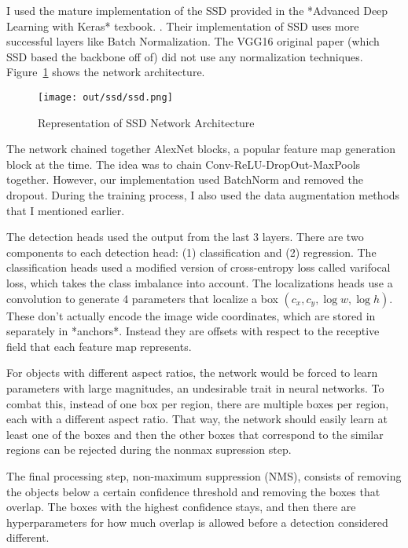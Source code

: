\documentclass[12pt]{article}
\begin{document}
I used the mature implementation of the SSD provided in the *Advanced Deep Learning with Keras* texbook. \cite{atienzaAdvancedDeepLearning2020}. Their implementation of SSD uses more successful layers like Batch Normalization. \cite{ioffeBatchNormalizationAccelerating2015}  The VGG16 original paper (which SSD based the backbone off of) did not use any normalization techniques. \cite{simonyanVeryDeepConvolutional2015} Figure~\ref{fig:ssd_network} shows the network architecture.

\begin{figure}[h]
    \centering
    \texttt{[image: out/ssd/ssd.png]}
    \caption{Representation of SSD Network Architecture}
    \label{fig:ssd_network}
\end{figure}

The network chained together AlexNet blocks, a popular feature map generation block at the time. \cite{krizhevskyImageNetClassificationDeep2012} The idea was to chain Conv-ReLU-DropOut-MaxPools together. However, our implementation used BatchNorm and removed the dropout. During the training process, I also used the data augmentation methods that I mentioned earlier. 

The detection heads used the output from the last 3 layers. There are two components to each detection head: (1) classification and (2) regression. The classification heads used a modified version of cross-entropy loss called varifocal loss, which takes the class imbalance into account. \cite{zhangVarifocalNetIoUawareDense2021} The localizations heads use a convolution to generate 4 parameters that localize a box $(c_x, c_y,\log{w},\log{h})$. These don't actually encode the image wide coordinates, which are stored in separately in *anchors*. Instead they are offsets with respect to the receptive field that each feature map represents. 

For objects with different aspect ratios, the network would be forced to learn parameters with large magnitudes, an undesirable trait in neural networks. To combat this, instead of one box per region, there are multiple boxes per region, each with a different aspect ratio. That way, the network should easily learn at least one of the boxes and then the other boxes that correspond to the similar regions can be rejected during the nonmax supression step. 

The final processing step, non-maximum suppression (NMS), consists of removing the objects below a certain confidence threshold and removing the boxes that overlap. The boxes with the highest confidence stays, and then there are hyperparameters for how much overlap is allowed before a detection considered different.
\end{document}
